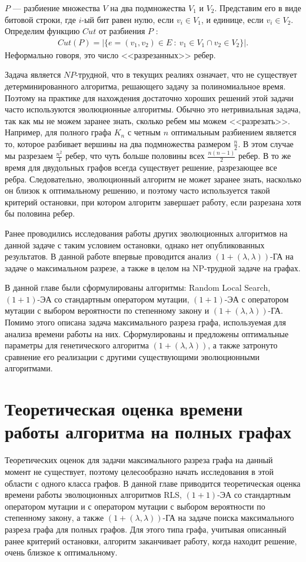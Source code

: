 \documentclass[times]{itmo-student-thesis}
\newcommand{\alglambda}{${(1 + (\lambda , \lambda))}$\xspace}
\newcommand{\alglambdaf}{${(1 + (\lambda , \lambda))}$-ГА\xspace}
\newcommand{\oea}{\mbox{$(1 + 1)$-ЭА}\xspace}
\begin{document}
$P$ --- разбиение множества $V$ на два подмножества $V_1$ и $V_2$.
Представим его в виде битовой строки, где $i$-ый бит равен нулю, если $v_i \in V_1$, и единице, если $v_i \in V_2$.
Определим функцию  $Cut$ от разбиения $P$ :
\begin{align*}
   Cut(P) = |\{e = (v_1, v_2) \in E ~:~ v_1 \in V_1 \cap v_2 \in V_2\}|.
\end{align*}
Неформально говоря, это число <<разрезанных>> ребер.

Задача является $NP$-трудной, что в текущих реалиях означает, что не существует детерминированного алгоритма, решающего задачу за полиномиальное время. Поэтому на практике для нахождения достаточно хороших решений этой задачи часто используются эволюционные алгоритмы.
Обычно это нетривиальная задача, так как мы не можем заранее знать, сколько ребем мы можем <<разрезать>>. Например, для полного графа $K_n$ с четным $n$ оптимальным разбиением является то, которое разбивает вершины на два подмножества размером $\frac{n}{2}$. В этом случае мы разрезаем $\frac{n^2}{4}$ ребер, что чуть больше половины всех $\frac{n(n-1)}{2}$ ребер. В то же время для двудольных графов всегда существует решение, разрезающее все ребра. Следовательно, эволюционный алгоритм не может заранее знать, насколько он близок к оптимальному решению, и поэтому часто используется такой критерий остановки, при котором алгоритм завершает работу, если разрезана хотя бы половина ребер.

Ранее проводились исследования работы других эволюционных алгоритмов на данной задаче с таким условием остановки, однако нет опубликованных результатов.
В данной работе впервые проводится анализ \alglambdaf на задаче о максимальном разрезе, а также в целом на NP-трудной задаче на графах.

\chapterconclusion
В данной главе были сформулированы алгоритмы: Random Local Search, \oea со стандартным оператором мутации, \oea с оператором мутации с выбором вероятности по степенному закону и \alglambdaf. Помимо этого описана задача максимального разреза графа, используемая для анализа времени работы на них. Сформулированы и предложены оптимальные параметры для генетического алгоритма \alglambda, а также затронуто сравнение его реализации с другими существующими эволюционными алгоритмами.

\chapter{Теоретическая оценка времени работы алгоритма на полных графах}
Теоретических оценок для задачи максимального разреза графа на данный момент не существует, поэтому целесообразно начать исследования в этой области с одного класса графов.
В данной главе приводится теоретическая оценка времени работы эволюционных алгоритмов RLS, \oea со стандартным оператором мутации и с оператором мутации с выбором вероятности по степенному закону, а также \alglambdaf на задаче поиска максимального разреза графа для полных графов.
Для этого типа графа, учитывая описанный ранее критерий остановки, алгоритм заканчивает работу, когда находит решение, очень близкое к оптимальному.
\end{document}
